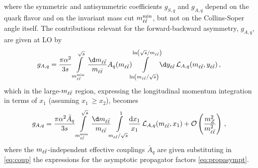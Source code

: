 where the symmetric and antisymmetric coefficients $g_{S,q}$ and $g_{A,q}$ depend on the quark flavor
and on the invariant mass cut $m_{\ell\bar{\ell}}^{\text{min}}$, but not on the
Collins-Soper angle itself.
%
The contributions relevant for the forward-backward asymmetry, $g_{A,q}$,
are given at LO by
\begin{equation}
\label{eq:gAq_integrated_1}
g_{A,q} =\frac{\pi \alpha^2}{3 s} \int\limits_{\mll^{\text{min}}}^{\sqrt s}\frac{\d\mll}{\mll}A_{q}(\mll)\!\!\int\limits_{\ln(\mll/\sqrt s)}^{\ln(\sqrt s/\mll)}\!\!\d\yll\, \mathcal{L}_{A,q}(\mll,\yll) \, ,
\end{equation}
which in the large-$m_{\ell\bar{\ell}}$ region,
 expressing the longitudinal momentum integration in terms of
$x_1$ (assuming $x_1~\ge x_2$), becomes
\begin{equation}
  g_{A,q} = \frac{\pi \alpha^2\bar A_q}{3 s} \int\limits_{\mll^{\text{min}}}^{\sqrt s}\frac{\d\mll}{\mll}
  \!\!\int\limits_{\mll/\sqrt s}^{1}\!\!\frac{\text{d}x_1}{x_1}\, 
  \mathcal{L}_{A,q}(\mll,x_1)+\mathcal{O} \left(\frac{m_Z^2}{\mll^2}\right) \, ,
  \label{eq:gAq_integrated}
\end{equation}
where the $m_{\ell\bar{\ell}}$-independent effective couplings $\bar A_q$  are
given substituting in \cref{eq:coup} the expressions for
the asymptotic propagator factors \cref{eq:propasympt}.

